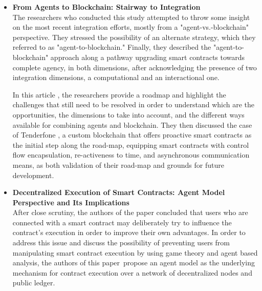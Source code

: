 \begin{itemize}

\item \textbf{From Agents to Blockchain: Stairway to Integration} \\

The researchers who conducted this study attempted to throw some insight on the most recent integration efforts, mostly from a "agent-vs.-blockchain" perspective. They stressed the possibility of an alternate strategy, which they referred to as "agent-to-blockchain." Finally, they described the "agent-to-blockchain" approach along a pathway upgrading smart contracts towards complete agency, in both dimensions, after acknowledging the presence of two integration dimensions, a computational and an interactional one.

\vspace{.5cm}

In this article \cite{ag2bc}, the researchers provide a roadmap and highlight the challenges that still need to be resolved in order to understand which are the opportunities, the dimensions to take into account, and the different ways available for combining agents and blockchain. They then discussed the case of Tenderfone \cite{tenGlab}, a custom blockchain that offers proactive smart contracts as the initial step along the road-map, equipping smart contracts with control flow encapsulation, re-activeness to time, and asynchronous communication means, as both validation of their road-map and grounds for future development.

\vspace{.5cm}

\item \textbf{Decentralized Execution of Smart Contracts: Agent Model Perspective and Its Implications} \\

After close scrutiny, the authors of the paper \cite{decentralized} concluded that users who are connected with a smart contract may deliberately try to influence the contract's execution in order to improve their own advantages. In order to address this issue and discuss the possibility of preventing users from manipulating smart contract execution by using game theory and agent based analysis, the authors of this paper propose an agent model as the underlying mechanism for contract execution over a network of decentralized nodes and public ledger.

\vspace{.5cm}


\end{itemize}
